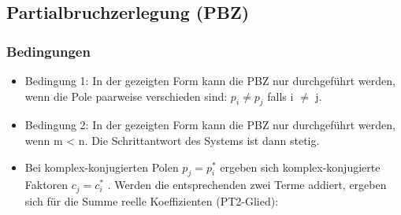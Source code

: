 \subsection{Partialbruchzerlegung (PBZ) }
\subsubsection{Bedingungen}
\begin{itemize}
\item Bedingung 1: In der gezeigten Form kann die PBZ nur durchgeführt werden,
wenn die Pole paarweise verschieden sind: $p_{i} \neq p_{j}$ falls i $\neq$ j.
\item Bedingung 2: In der gezeigten Form kann die PBZ nur durchgeführt werden, wenn m < n. Die Schrittantwort des Systems ist dann stetig.
\item Bei komplex-konjugierten Polen $p_{j} = p^{\ast}_{i}$ ergeben sich komplex-konjugierte Faktoren
$c_{j} = c^{\ast}_{i}$ . Werden die entsprechenden zwei Terme addiert, ergeben sich
für die Summe reelle Koeffizienten (PT2-Glied):
\end{itemize}
